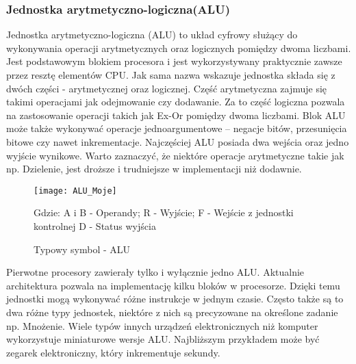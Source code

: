 \documentclass[12pt, a4paper, onside, polish]{article}				%
\begin{document}
\cleardoublepage

\subsubsection{Jednostka arytmetyczno-logiczna(ALU)}
\hspace{\parindent}
	Jednostka arytmetyczno-logiczna (ALU) to układ cyfrowy służący do wykonywania operacji arytmetycznych oraz logicznych pomiędzy dwoma liczbami. Jest podstawowym blokiem procesora i jest wykorzystywany praktycznie zawsze przez resztę elementów CPU. Jak sama nazwa wskazuje jednostka składa się z dwóch części - arytmetycznej oraz logicznej. Część arytmetyczna zajmuje się takimi operacjami jak odejmowanie czy dodawanie. Za to część logiczna pozwala na zastosowanie operacji takich jak Ex-Or pomiędzy dwoma liczbami. Blok ALU może także wykonywać operacje jednoargumentowe – negacje bitów, przesunięcia bitowe czy nawet inkrementacje. Najczęściej ALU posiada dwa wejścia oraz jedno wyjście wynikowe. Warto zaznaczyć, że niektóre operacje arytmetyczne takie jak np. Dzielenie, jest droższe i trudniejsze w implementacji niż dodawnie. 

\begin{figure}[hbt!]
{\centering \texttt{[image: ALU\_Moje]} \caption{Typowy symbol - ALU}}\vspace{5mm}
Gdzie:\newline
A i B - Operandy;\newline
R - Wyjście;\newline
F - Wejście z jednostki kontrolnej\newline
D - Status wyjścia\newline
\end{figure}

	Pierwotne procesory zawierały tylko i wyłącznie jedno ALU. Aktualnie architektura pozwala na implementację kilku bloków w procesorze. Dzięki temu jednostki mogą wykonywać różne instrukcje w jednym czasie. Często także są to dwa różne typy jednostek, niektóre z nich są precyzowane na określone zadanie np. Mnożenie. Wiele typów innych urządzeń elektronicznych niż komputer wykorzystuje miniaturowe wersje ALU. Najbliższym przykładem może być zegarek elektroniczny, który inkrementuje sekundy.  
\cleardoublepage
\end{document}
